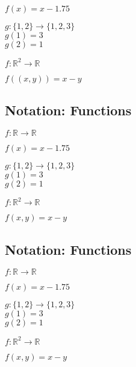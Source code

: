 \documentclass[twocolumn,20pt,fleqn]{extarticle}
\newcommand{\sep}{\vspace{0.5cm}}
\theoremstyle{plain}
\theoremstyle{definition}
\theoremstyle{remark}
\begin{document}
$f(x) = x - 1.75$\\

\sep

  $g : \{1,2\} \to \{1,2,3\}$\\
    $g(1) = 3$\\
    $g(2) = 1$\\

\sep

$ f: \mathbb{R}^2  \to \mathbb{R}$

$f((x,y)) = x - y$



\clearpage




\subsection{Notation: Functions}

$ f: \mathbb{R}  \to \mathbb{R}$

$f(x) = x - 1.75$\\

\sep

  $g : \{1,2\} \to \{1,2,3\}$\\
    $g(1) = 3$\\
    $g(2) = 1$\\

\sep

$ f: \mathbb{R}^2  \to \mathbb{R}$

$f(  x,y  ) = x - y$


\sep




\clearpage




\subsection{Notation: Functions}

$ f: \mathbb{R}  \to \mathbb{R}$

$f(x) = x - 1.75$\\

\sep

  $g : \{1,2\} \to \{1,2,3\}$\\
    $g(1) = 3$\\
    $g(2) = 1$\\

\sep

$ f: \mathbb{R}^2  \to \mathbb{R}$

$f(  x,y  ) = x - y$
\end{document}
